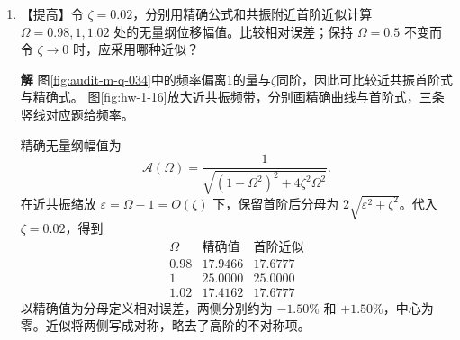 \documentclass[11pt,openany,fontset=fandol]{ctexbook}
\theoremstyle{plain}\newtheorem{theorem}{定理}[chapter]\newtheorem{proposition}[theorem]{命题}
\theoremstyle{definition}\newtheorem{definition}{定义}[chapter]\newtheorem{example}{例}[chapter]
\theoremstyle{remark}\newtheorem*{remark}{说明}
\newcommand{\SolutionStart}{\par\nobreak\medskip\nobreak\noindent\textbf{解}\quad\ignorespaces}
\newenvironment{solution}{\SolutionStart}{\par\medskip}
\begin{document}
\begin{enumerate}[label=1.\arabic*]
\begin{solution}
\begin{figure}[H]\centering
{}
\caption{题1.15：弹簧和阻尼器的左端随同一底座运动；$x,y$ 均为绝对位移。}\label{fig:ex-1-15}
\end{figure}

图上的形变量是两端位移之差，相对速度同理；把底座加速度移到相对坐标方程右侧，才得到等效惯性驱动力。
\end{solution}

\item \begin{minipage}[t]{\linewidth}
【提高】令 $\zeta=0.02$，分别用精确公式和共振附近首阶近似计算 $\Omega=0.98,1,1.02$ 处的无量纲位移幅值。比较相对误差；保持 $\Omega=0.5$ 不变而令 $\zeta\to0$ 时，应采用哪种近似？
\end{minipage}

\begin{solution}
图\ref{fig:audit-m-q-034}中的频率偏离1的量与$\zeta$同阶，因此可比较近共振首阶式与精确式。
图\ref{fig:hw-1-16}放大近共振频带，分别画精确曲线与首阶式，三条竖线对应题给频率。

精确无量纲幅值为
\[
\mathcal A(\Omega)=\frac1{\sqrt{(1-\Omega^2)^2+4\zeta^2\Omega^2}}.
\]
在近共振缩放 $\varepsilon=\Omega-1=O(\zeta)$ 下，保留首阶后分母为 $2\sqrt{\varepsilon^2+\zeta^2}$。代入 $\zeta=0.02$，得到
\[
\begin{array}{c|rr}
\Omega&\text{精确值}&\text{首阶近似}\\
0.98&17.9466&17.6777\\
1&25.0000&25.0000\\
1.02&17.4162&17.6777
\end{array}
\]
以精确值为分母定义相对误差，两侧分别约为 $-1.50\%$ 和 $+1.50\%$，中心为零。近似将两侧写成对称，略去了高阶的不对称项。


\end{solution}
\end{enumerate}
\end{document}
